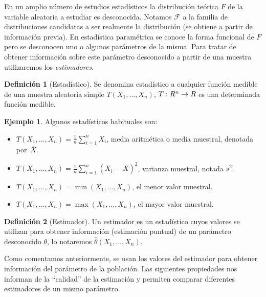 \documentclass[12pt,a4paper]{report} %
\let\mathbb\relax
\newcommand{\olsi}[1]{\,\overline{\!{#1}}} %
\theoremstyle{definition}
\newtheorem{definition}{Definición}[section]
\newtheorem{example}[theorem]{Ejemplo}
\begin{document}
En un amplio número de estudios estadísticos la distribución teórica $F$ de la variable aleatoria a estudiar es desconocida. Notamos $\mathcal{F}$ a la familia de distribuciones candidatas a ser realmente la distribución (se obtiene a partir de información previa). En estadística paramétrica se conoce la forma funcional de $F$ pero se desconocen uno o algunos parámetros de la misma. Para tratar de obtener información sobre este parámetro desconocido a partir de una muestra utilizaremos los \textit{estimadores}.\\

\begin{definition}[Estadístico]
  Se denomina estadístico a cualquier función medible de una muestra aleatoria simple $T(X_1,\dots,X_n)$, $T:\mathbb{R}^n\to \mathbb{R}$ es una determinada función medible.\\
\end{definition}

\begin{example}
  Algunos estadísticos habituales son:

  \begin{itemize}
  \item $T(X_1,\dots,X_n) = \frac{1}{n}\sum_{i=1}^nX_i$, media aritmética o media muestral, denotada por $\olsi{X}$.
  \item $T(X_1,\dots,X_n) = \frac{1}{n}\sum_{i=1}^n\left(X_i-\olsi{X} \right)^2$, varianza muestral, notada $s^2$.
  \item $T(X_1,\dots,X_n) = \min (X_1,\dots,X_n)$, el menor valor muestral.
  \item $T(X_1,\dots,X_n) = \max (X_1,\dots,X_n)$, el mayor valor muestral.\\
  \end{itemize}
\end{example}

\begin{definition}[Estimador]
Un estimador es un estadístico cuyos valores se utilizan para obtener información (estimación puntual) de un parámetro desconocido $\theta$, lo notaremos  $\widehat{\theta}(X_1, \dots, X_n)$.\\
\end{definition}

Como comentamos anteriormente, se usan los valores del estimador para obtener información del parámetro de la población. Las siguientes propiedades nos informan de la ``calidad'' de la estimación y permiten comparar diferentes estimadores de un mismo parámetro.\\
\end{document}
